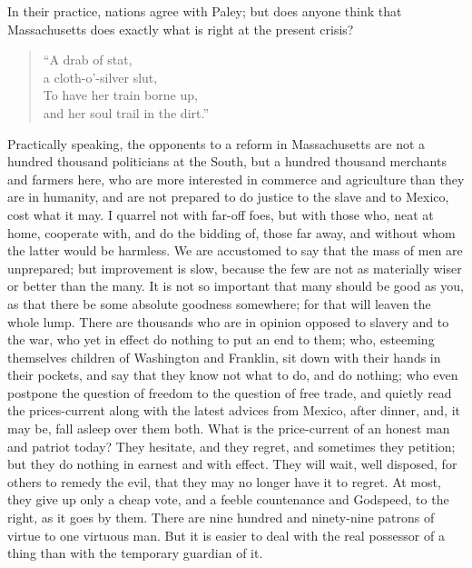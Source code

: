 \documentclass[letterpaper,12pt]{article}
\begin{document}
In their practice, nations agree with Paley; but does anyone think that
Massachusetts does exactly what is right at the present crisis?

\begin{verse}
    \enquote{A drab of stat, \\
        a cloth-o'-silver slut, \\
        To have her train borne up, \\
        and her soul trail in the dirt.}
\end{verse}

Practically speaking, the opponents to a reform in Massachusetts are not
a hundred thousand politicians at the South, but a hundred thousand merchants
and farmers here, who are more interested in commerce and agriculture than they
are in humanity, and are not prepared to do justice to the slave and to Mexico,
cost what it may. I quarrel not with far-off foes, but with those who, neat at
home, cooperate with, and do the bidding of, those far away, and without whom
the latter would be harmless. We are accustomed to say that the mass of men are
unprepared; but improvement is slow, because the few are not as materially wiser
or better than the many. It is not so important that many should be good as you,
as that there be some absolute goodness somewhere; for that will leaven the
whole lump. There are thousands who are in opinion opposed to slavery and to the
war, who yet in effect do nothing to put an end to them; who, esteeming
themselves children of Washington and Franklin, sit down with their hands in
their pockets, and say that they know not what to do, and do nothing; who even
postpone the question of freedom to the question of free trade, and quietly read
the prices-current along with the latest advices from Mexico, after dinner, and,
it may be, fall asleep over them both. What is the price-current of an honest
man and patriot today? They hesitate, and they regret, and sometimes they
petition; but they do nothing in earnest and with effect.  They will wait, well
disposed, for others to remedy the evil, that they may no longer have it to
regret. At most, they give up only a cheap vote, and a feeble countenance and
Godspeed, to the right, as it goes by them. There are nine hundred and
ninety-nine patrons of virtue to one virtuous man. But it is easier to deal with
the real possessor of a thing than with the temporary guardian of it.
\end{document}
